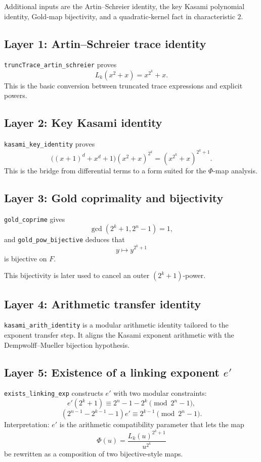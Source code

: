 \documentclass[11pt]{article}
\begin{document}
Additional inputs are the Artin--Schreier identity, the key Kasami polynomial identity,
Gold-map bijectivity, and a quadratic-kernel fact in characteristic $2$.

\subsection*{Layer 1: Artin--Schreier trace identity}
\texttt{truncTrace\_artin\_schreier} proves
\[
  L_k(x^2+x)=x^{2^k}+x.
\]
This is the basic conversion between truncated trace expressions and explicit powers.

\subsection*{Layer 2: Key Kasami identity}
\texttt{kasami\_key\_identity} proves
\[
\bigl((x+1)^d+x^d+1\bigr)(x^2+x)^{2^k}=(x^{2^k}+x)^{2^k+1}.
\]
This is the bridge from differential terms to a form suited for the $\Phi$-map analysis.

\subsection*{Layer 3: Gold coprimality and bijectivity}
\texttt{gold\_coprime} gives
\[
  \gcd(2^k+1,2^n-1)=1,
\]
and \texttt{gold\_pow\_bijective} deduces that
\[
  y\mapsto y^{2^k+1}
\]
is bijective on $F$.

This bijectivity is later used to cancel an outer $(2^k+1)$-power.

\subsection*{Layer 4: Arithmetic transfer identity}
\texttt{kasami\_arith\_identity} is a modular arithmetic identity tailored to the exponent transfer step.
It aligns the Kasami exponent arithmetic with the Dempwolff--Mueller bijection hypothesis.

\subsection*{Layer 5: Existence of a linking exponent $e'$}
\texttt{exists\_linking\_exp} constructs $e'$ with two modular constraints:
\[
e'(2^k+1)\equiv 2^n-1-2^k \pmod{2^n-1},
\]
\[
(2^{n-1}-2^{k-1}-1)e'\equiv 2^{k-1} \pmod{2^n-1}.
\]
Interpretation: $e'$ is the arithmetic compatibility parameter that lets the map
\[
\Phi(u)=\frac{L_k(u)^{2^k+1}}{u^{2^k}}
\]
be rewritten as a composition of two bijective-style maps.
\end{document}
